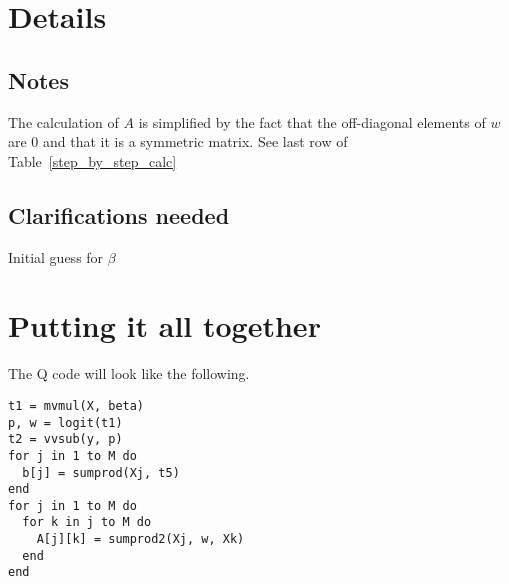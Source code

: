 \documentclass[12pt,timesnewroman,letterpaper]{article}
\begin{document}
\section{Details}

\subsection{Notes}

\be
\item The calculation of \(A\) is simplified by the fact that the off-diagonal
  elements of \(w\) are 0 and that it is a symmetric matrix. See last row of
  Table~\ref{step_by_step_calc}
\ee
\subsection{Clarifications needed}

\be
\item Initial guess for \(\beta\)
\ee

\section{Putting it all together}
The Q code will look like the following.

\begin{verbatim}
t1 = mvmul(X, beta)  
p, w = logit(t1)  
t2 = vvsub(y, p)
for j in 1 to M do 
  b[j] = sumprod(Xj, t5) 
end
for j in 1 to M do 
  for k in j to M do 
    A[j][k] = sumprod2(Xj, w, Xk)
  end
end
\end{verbatim}
\end{document}
